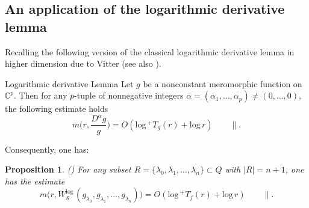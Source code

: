 \documentclass[english, 12pt]{amsart}
\def\log{\mathrm{log}\,}
\theoremstyle{plain}
\newtheorem{pro}[thm]{Proposition}
\theoremstyle{remark}
\numberwithin{equation}{section}
\theoremstyle{plain}
\newcommand{\thistheoremname}{}
\newtheorem*{genericthm*}{\thistheoremname}
\newenvironment{namedthm*}[1]{\renewcommand{\thistheoremname}{#1}%
	\begin{genericthm*}}
	{\end{genericthm*}}
\theoremstyle{named}
\begin{document}
\subsection{An application of the logarithmic derivative lemma}
Recalling the following version of the classical logarithmic derivative lemma in higher dimension due to Vitter \cite{Vitter77} (see also \cite{Fujimoto1985}).
\begin{namedthm*}{Logarithmic derivative Lemma}
Let $g$ be a nonconstant meromorphic function on $\mathbb{C}^p$. Then for any $p$-tuple of nonnegative integers $\alpha=(\alpha_1,\dots,\alpha_p)\not=(0,\dots,0)$, the following estimate holds
\[
m\bigg(r,\dfrac{D^{\alpha}g}{g}\bigg)
=O(\log^+ T_g(r)+\log r)\qquad\parallel.
\]	
\end{namedthm*}
Consequently, one has:	
\begin{pro}(\cite{Vitter77,Fujimoto1985})
\label{logarithmic derivative estimate for log wronskian g_lambda i}	
For any subset $R=\{\lambda_0,\lambda_1,\dots,\lambda_n\}\subset Q$ with $|R|=n+1$, one has the estimate
\begin{equation}
\label{estimate of logarithmic wronskian}
m\big(r,W^{\log}_{\mathcal{S}}(g_{\lambda_0},g_{\lambda_1},\dots,g_{\lambda_n})\big)
=O(\log^+T_f(r)+\log r)\qquad\parallel.
\end{equation}
\end{pro}
\end{document}
